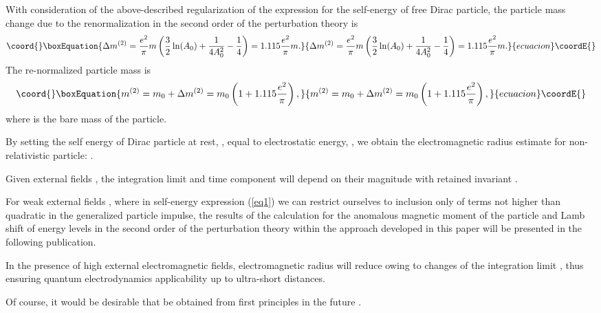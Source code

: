 \documentclass[a4paper,draft,showpacs,preprint,prd,aps]{revtex4}
\begin{document}
With consideration of the above-described regularization of the expression
for the self-energy of free Dirac particle, the particle mass change due to
the renormalization in the second order of the perturbation theory is
\begin{equation}\coord{}\boxEquation{
\label{eq15}
\Delta m^{(2)} = \frac{e^2}\pi m \left(
\frac 32\ln(A_0)+\frac 1{4A_0^2}-\frac 14\right)=
1.115\frac{e^2}\pi m.
}{
\Delta m^{(2)} = \frac{e^2}\pi m \left(
\frac 32\ln(A_0)+\frac 1{4A_0^2}-\frac 14\right)=
1.115\frac{e^2}\pi m.
}{ecuacion}\coordE{}\end{equation}
The re-normalized particle mass is
\begin{equation}\coord{}\boxEquation{
\label{eq16}
m^{(2)} = m_0 + \Delta m^{(2)} = m_0\left(1 + 1.115\frac{e^2}\pi\right),
}{
m^{(2)} = m_0 + \Delta m^{(2)} = m_0\left(1 + 1.115\frac{e^2}\pi\right),
}{ecuacion}\coordE{}\end{equation}
where \coordHE{} is the bare mass of the particle.

By setting the self energy of Dirac particle at rest,
\coordHE{},
equal to electrostatic energy, \coordHE{}, we obtain the
electromagnetic radius estimate for non-relativistic particle:
\coordHE{}.

Given external fields \coordHE{}, the integration limit
\coordHE{} and time component \coordHE{} will depend on their magnitude with
retained invariant \coordHE{}.

For weak external fields \coordHE{}, where in self-energy
expression (\ref{eq1}) we can restrict ourselves to inclusion only
of terms not higher than quadratic in the generalized particle impulse,
the results of the calculation for the anomalous magnetic moment of the
particle and Lamb shift of energy levels in the second order of the
perturbation theory within the approach developed in this paper will be
presented in the following publication.

In the presence of high external electromagnetic fields, electromagnetic
radius \coordHE{} will reduce owing to changes of the integration limit
\coordHE{}, thus ensuring quantum electrodynamics applicability up to
ultra-short distances.

Of course, it would be desirable that \coordHE{}
be obtained from first principles in the future .
\end{document}
